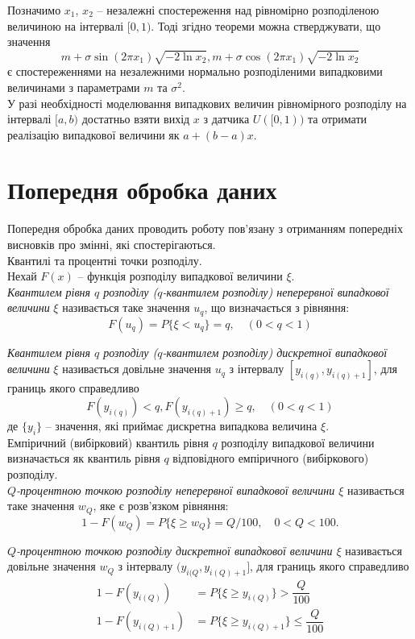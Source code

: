 Позначимо $x_1$, $x_2$ -- незалежні спостереження над рівномірно розподіленою величиною на інтервалі $[0, 1)$. Тоді згідно теореми можна стверджувати, що значення 
\[ m + \sigma \sin (2 \pi x_1) \sqrt{- 2 \ln x_2}, m + \sigma \cos (2 \pi x_1) \sqrt{- 2 \ln x_2} \]
є спостереженнями на незалежними нормально розподіленими випадковими величинами з параметрами $m$ та $\sigma^2$. \\

У разі необхідності моделювання випадкових величин рівномірного розподілу на інтервалі $[a, b)$ достатньо взяти вихід $x$ з датчика $U([0,1))$ та отримати реалізацію випадкової величини як $a + (b - a) x$.

\section{Попередня обробка даних}

Попередня обробка даних проводить роботу пов'язану з отриманням попередніх висновків про змінні, які спостерігаються. \\

Квантилі та процентні точки розподілу. \\

Нехай $F(x)$ -- функція розподілу випадкової величини $\xi$. \\

\textit{Квантилем рівня $q$ розподілу ($q$-квантилем розподілу) неперервної випадкової величини} $\xi$ називається таке значення $u_q$, що визначається з рівняння:
\[ F(u_q) = P \{ \xi < u_q\} = q, \quad (0 < q < 1) \]

\textit{Квантилем рівня $q$ розподілу ($q$-квантилем розподілу) дискретної випадкової величини} $\xi$ називається довільне значення $u_q$ з інтервалу $[y_{i(q)}, y_{i(q) + 1}]$, для границь якого справедливо
\[ F(y_{i(q)}) < q, F(y_{i(q) + 1}) \ge q, \quad (0 < q < 1) \]
де $\{y_i\}$ -- значення, які приймає дискретна випадкова величина $\xi$. \\

Емпіричний (вибірковий) квантиль рівня $q$ розподілу випадкової величини визначається як квантиль рівня $q$ відповідного емпіричного (вибіркового) розподілу. \\

\textit{$Q$-процентною точкою розподілу неперервної випадкової величини $\xi$} називається таке значення $w_Q$, яке є розв'язком рівняння:
\[ 1 - F(w_Q) = P \{ \xi \ge w_Q \} = Q / 100, \quad 0 < Q < 100. \]

\textit{$Q$-процентною точкою розподілу дискретної випадкової величини $\xi$} називається довільне значення $w_Q$ з інтервалу $(y_{i(Q}, y_{i(Q) + 1}]$, для границь якого справедливо
\begin{align*}
    1 - F(y_{i(Q)}) &= P \{ \xi \ge y_{i(Q)} \} > \dfrac{Q}{100} \\
    1 - F(y_{i(Q) + 1}) &= P \{ \xi \ge y_{i(Q) + 1} \} \le \dfrac{Q}{100} \\
\end{align*} 

